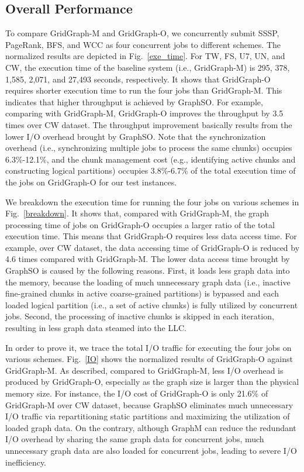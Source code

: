\documentclass[10pt,journal,compsoc]{IEEEtran}
\begin{document}
\subsection{Overall Performance}
\vspace{-2pt}
To compare GridGraph-M and GridGraph-O, we concurrently submit SSSP, PageRank, BFS, and WCC as four concurrent jobs to different schemes. The normalized results are depicted in Fig.~\ref{exe_time}.
For TW, FS, U7, UN, and CW, the execution time of the baseline system (i.e., GridGraph-M) is 295, 378, 1,585, 2,071, and 27,493 seconds, respectively.
It shows that GridGraph-O requires shorter execution time to run the four jobs than GridGraph-M. This indicates that higher throughput is achieved by GraphSO. For example, comparing with GridGraph-M, GridGraph-O improves the throughput by 3.5 times over CW dataset. The throughput improvement basically results from the lower I/O overhead brought by GraphSO. Note that the synchronization overhead (i.e., synchronizing multiple jobs to process the same chunks) occupies 6.3\%-12.1\%, and the chunk management cost (e.g., identifying active chunks and constructing logical partitions) occupies 3.8\%-6.7\% of the total execution time of the jobs on GridGraph-O for our test instances.

We breakdown the execution time for running the four jobs on various schemes in Fig.~\ref{breakdown}. It shows that, compared with GridGraph-M, the graph processing time of jobs on GridGraph-O occupies a larger ratio of the total execution time. This means that GridGraph-O requires less data access time. For example, over CW dataset, the data accessing time of GridGraph-O is reduced by 4.6 times compared with GridGraph-M. The lower data access time brought by GraphSO is caused by the following reasons. First, it loads  less graph data into the memory, because the loading of much unnecessary graph data (i.e., inactive fine-grained chunks in active coarse-grained partitions) is bypassed and each loaded logical partition (i.e., a set of active chunks) is fully utilized by concurrent jobs.
Second, the processing of inactive chunks is skipped in each iteration,  resulting in less graph data steamed into the LLC.

In order to prove it, we trace the total I/O traffic for executing the four jobs on various schemes. Fig.~\ref{IO} shows the normalized results of GridGraph-O against GridGraph-M. As described, compared to GridGraph-M, less I/O overhead is produced by GridGraph-O, especially as the graph size is larger than the physical memory size. For instance, the I/O cost of GridGraph-O is only 21.6\% of GridGraph-M over CW dataset, because GraphSO eliminates much unnecessary I/O traffic via repartitioning static partitions and maximizing the utilization of loaded graph data. On the contrary, although GraphM can reduce the redundant I/O overhead by sharing the same graph data for concurrent jobs, much unnecessary graph data are also loaded for concurrent jobs, leading to severe I/O inefficiency.
\end{document}
